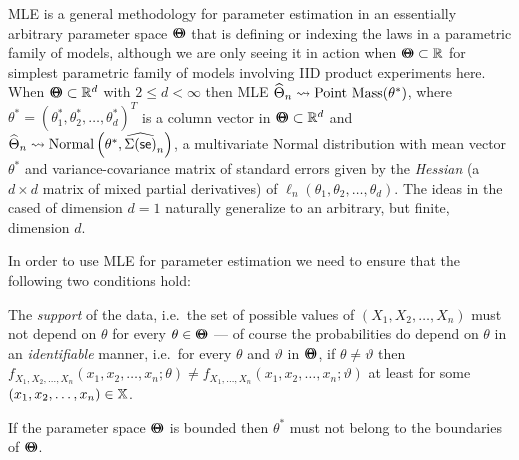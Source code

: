 MLE is a general methodology for parameter estimation in an essentially arbitrary parameter space ${\Theta}\mspace{-11 mu}{\Theta}$ that is defining or indexing the laws in a parametric family of models, although we are only seeing it in action when ${\Theta}\mspace{-11 mu}{\Theta} \subset \mathbb{R}$ for simplest parametric family of models involving IID product experiments here.  
When ${\Theta}\mspace{-11 mu}{\Theta} \subset \mathbb{R}^d$ with $2 \leq d < \infty$ then MLE $\widehat{\Theta}_n \rightsquigarrow \mbox{{\rm Point~Mass}}(\theta^*)$, where $\theta^*=(\theta^*_1,\theta^*_2,\ldots,\theta^*_d)^{T}$ is a column vector in ${\Theta}\mspace{-11 mu}{\Theta} \subset \mathbb{R}^d$ 
and $\widehat{\Theta}_n \rightsquigarrow \mbox{{\rm Normal}}\left(\theta^*,\widehat{\Sigma(\mathsf{se})}_n\right)$, a multivariate Normal distribution with mean vector $\theta^*$ and variance-covariance matrix of standard errors given by the {\em Hessian} (a $d \times d$ matrix of mixed partial derivatives) of $\ell_n(\theta_1,\theta_2,\ldots,\theta_d)$.  The ideas in the cased of dimension $d=1$ naturally generalize to an arbitrary, but finite, dimension $d$.
 
\begin{rem}
In order to use MLE for parameter estimation we need to ensure that the following two conditions hold:
\be
\item The {\em support} of the data, i.e.~the set of possible values of $(X_1,X_2,\ldots,X_n)$ must not depend on $\theta$ for every $\theta \in {\Theta}\mspace{-11 mu}{\Theta}$ --- of course the probabilities do depend on $\theta$ in an {\em identifiable} manner, i.e.~for every $\theta$ and $\vartheta$ in ${\Theta}\mspace{-11 mu}{\Theta}$, if $\theta \neq \vartheta$ then $f_{X_1,X_2,\ldots,X_n}(x_1,x_2,\ldots,x_n;\theta) \neq f_{X_1,\ldots,X_n}(x_1,x_2,\ldots,x_n;\vartheta)$ at least for some $(x_1,x_2,\ldots,x_n) \in \mathbb{X}$.
\item If the parameter space ${\Theta}\mspace{-11 mu}{\Theta}$ is bounded then $\theta^*$ must not belong to the boundaries of ${\Theta}\mspace{-11 mu}{\Theta}$.
\ee
\end{rem}

